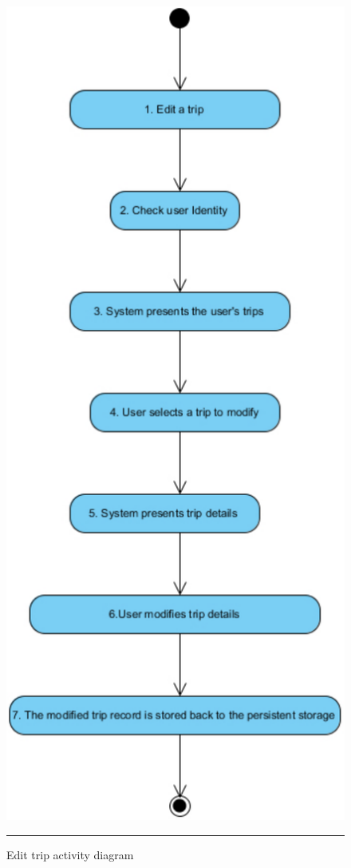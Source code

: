 \begin{figure}[htbp]
	\centering
		\includegraphics[scale=0.80]{./Figures/chapter4/figure3.pdf}
		\rule{35em}{0.5pt}
	\caption[Edit trip activity diagram]{Edit trip activity diagram}
	\label{fig:activityDiagramEditTrip}
\end{figure}


